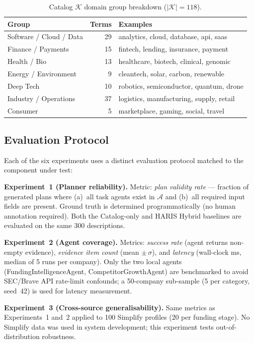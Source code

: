 \documentclass[preprint,12pt]{elsarticle}
\newcommand{\calK}{\mathcal{K}}
\newcommand{\calA}{\mathcal{A}}
\begin{document}
\begin{table}[t]
\centering
\caption{Catalog $\calK$ domain group breakdown ($|\calK|{=}118$).}
\label{tab:catalog_groups}
\begin{tabular}{lrl}
\toprule
\textbf{Group} & \textbf{Terms} & \textbf{Examples} \\
\midrule
Software / Cloud / Data   & 29 & analytics, cloud, database, api, saas \\
Finance / Payments        & 15 & fintech, lending, insurance, payment \\
Health / Bio              & 13 & healthcare, biotech, clinical, genomic \\
Energy / Environment      & 9  & cleantech, solar, carbon, renewable \\
Deep Tech                 & 10 & robotics, semiconductor, quantum, drone \\
Industry / Operations     & 37 & logistics, manufacturing, supply, retail \\
Consumer                  & 5  & marketplace, gaming, social, travel \\
\bottomrule
\end{tabular}
\end{table}

\subsection{Evaluation Protocol}
\label{sec:method_eval}

Each of the six experiments uses a distinct evaluation protocol matched to the
component under test:

\textbf{Experiment~1 (Planner reliability).} Metric: \emph{plan validity rate}
--- fraction of generated plans where (a)~all task agents exist in $\calA$ and
(b)~all required input fields are present. Ground truth is determined
programmatically (no human annotation required). Both the Catalog-only and HARIS
Hybrid baselines are evaluated on the same 300 descriptions.

\textbf{Experiment~2 (Agent coverage).} Metrics: \emph{success rate} (agent
returns non-empty evidence), \emph{evidence item count} (mean $\pm\,\sigma$),
and \emph{latency} (wall-clock ms, median of 5 runs per company). Only the two
local agents (FundingIntelligenceAgent, CompetitorGrowthAgent) are benchmarked
to avoid SEC/Brave API rate-limit confounds; a 50-company sub-sample (5 per
category, seed~42) is used for latency measurement.

\textbf{Experiment~3 (Cross-source generalisability).} Same metrics as
Experiments~1 and~2 applied to 100 Simplify profiles (20 per funding stage).
No Simplify data was used in system development; this experiment tests
out-of-distribution robustness.
\end{document}
